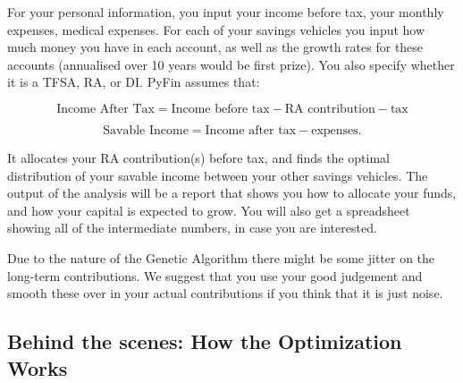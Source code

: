 \documentclass[a4paper, justified]{tufte-handout}
\begin{document}
For your personal information, you input your income before tax, your monthly expenses, medical expenses. For each of your savings vehicles you input how much money you have in each account, as well as the growth rates for these accounts (annualised over 10 years would be first prize). You also specify whether it is a TFSA, RA, or DI. PyFin assumes that:

\begin{equation}
\textrm{Income After Tax} = \textrm{Income before tax} - \textrm{RA contribution} - \textrm{tax}
\end{equation}

\begin{equation}
\textrm{Savable Income} = \textrm{Income after tax} - \textrm{expenses}.
\end{equation}

It allocates your RA contribution(s) before tax, and finds the optimal distribution of your savable income between your other savings vehicles. The output of the analysis will be a report that shows you how to allocate your funds, and how your capital is expected to grow. You will also get a spreadsheet showing all of the intermediate numbers, in case you are interested.


Due to the nature of the Genetic Algorithm there might be some jitter on the long-term contributions. We suggest that you use your good judgement and smooth these over in your actual contributions if you think that it is just noise.

\subsection{Behind  the scenes: How the Optimization Works}
\end{document}
